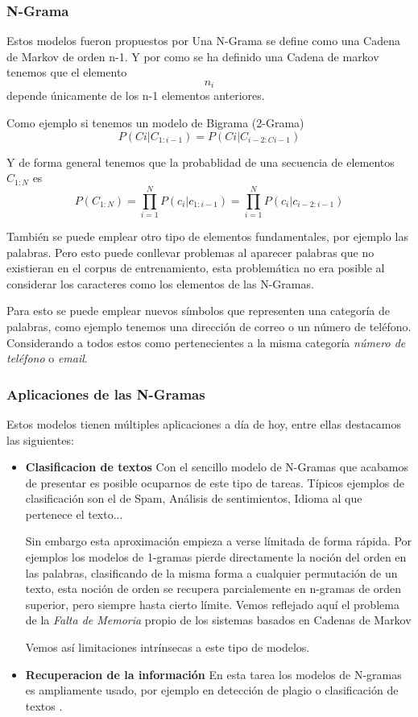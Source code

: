 \subsubsection{N-Grama}

Estos modelos fueron propuestos por \cite{markov1913essay} Una N-Grama se define como una Cadena de Markov de orden n-1. Y por como se ha definido una Cadena de markov tenemos que el elemento \[n_{i}\] depende únicamente de los n-1 elementos anteriores.

Como ejemplo si tenemos un modelo de Bigrama (2-Grama)
\[P(Ci | C_{1:i-1}) = P(Ci | C_{i-2:Ci-1})\]

Y de forma general tenemos que la probablidad de una secuencia de elementos \(C_{1:N}\) es
\[P(C_{1:N}) = \prod_{i=1}^{N}P(c_i | c_{1:i-1}) = \prod_{i=1}^{N} P(c_i | c_{i-2:i-1})\]

También se puede emplear otro tipo de elementos fundamentales, por ejemplo las palabras. Pero esto puede conllevar problemas al aparecer palabras que no existieran en el corpus de entrenamiento, esta problemática no era posible al considerar los caracteres como los elementos de las N-Gramas.

Para esto se puede emplear nuevos símbolos que representen una categoría de palabras, como ejemplo tenemos una dirección de correo o un número de teléfono. Considerando a todos estos como pertenecientes a la misma categoría \textit{número de teléfono} o \textit{email}.

\subsubsection{Aplicaciones de las N-Gramas}

Estos modelos tienen múltiples aplicaciones a día de hoy, entre ellas destacamos las siguientes:

\begin{itemize}
	\item \textbf{Clasificacion de textos} Con el sencillo modelo de N-Gramas que acabamos de presentar es posible ocuparnos de este tipo de tareas. Típicos ejemplos de clasificación son el de Spam, Análisis de sentimientos, Idioma al que pertenece el texto...

Sin embargo esta aproximación empieza a verse límitada de forma rápida. Por ejemplos los modelos de 1-gramas pierde directamente la noción del orden en las palabras, clasificando de la misma forma a cualquier permutación de un texto, esta noción de orden se recupera parcialemente en n-gramas de orden superior, pero siempre hasta cierto límite. Vemos reflejado aquí el problema de la \textit{Falta de Memoria} propio de los sistemas basados en Cadenas de Markov

Vemos así limitaciones intrínsecas a este tipo de modelos.

	\item \textbf{Recuperacion de la información} En esta tarea los modelos de N-gramas es ampliamente usado, por ejemplo en detección de plagio o clasificación de textos \cite{sood2022creation}.
\end{itemize}

